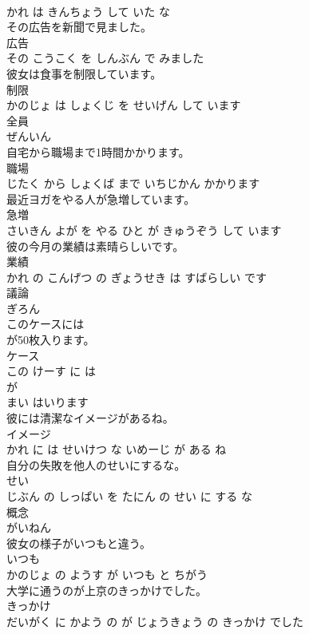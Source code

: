 \documentclass[8pt]{extreport}
\begin{document}
\begin{CJK}{UTF8}{min}
\\	かれ は きんちょう して いた な			
\\	その広告を新聞で見ました。	
\\	広告 
\\	その こうこく を しんぶん で みました			
\\	彼女は食事を制限しています。	
\\	制限 
\\	かのじょ は しょくじ を せいげん して います			
\\	全員	
\\	ぜんいん			
\\	自宅から職場まで1時間かかります。	
\\	職場 
\\	じたく から しょくば まで いちじかん かかります			
\\	最近ヨガをやる人が急増しています。	
\\	急増 
\\	さいきん よが を やる ひと が きゅうぞう して います			
\\	彼の今月の業績は素晴らしいです。	
\\	業績 
\\	かれ の こんげつ の ぎょうせき は すばらしい です			
\\	議論	
\\	ぎろん			
\\	このケースには
\\	が50枚入ります。	
\\	ケース 
\\	この けーす に は 
\\	が 
\\	まい はいります			
\\	彼には清潔なイメージがあるね。	
\\	イメージ 
\\	かれ に は せいけつ な いめーじ が ある ね			
\\	自分の失敗を他人のせいにするな。	
\\	せい 
\\	じぶん の しっぱい を たにん の せい に する な			
\\	概念	
\\	がいねん			
\\	彼女の様子がいつもと違う。	
\\	いつも 
\\	かのじょ の ようす が いつも と ちがう			
\\	大学に通うのが上京のきっかけでした。	
\\	きっかけ 
\\	だいがく に かよう の が じょうきょう の きっかけ でした			

\end{CJK}
\end{document}
